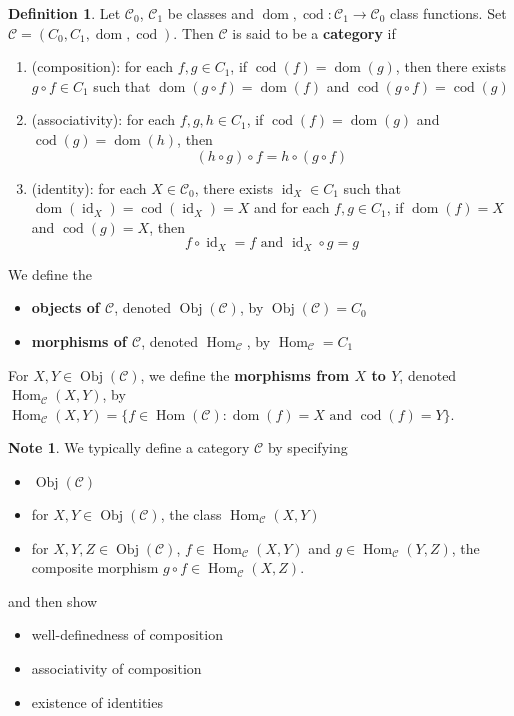 \documentclass{book}
\theoremstyle{definition}
\newtheorem{defn}[definition]{Definition}
\newtheorem{note}[definition]{Note}
\newcommand{\MC}{\mathcal{C}}
\newcommand{\ld}[1]{\label{defn:#1}}
\DeclareMathOperator{\id}{id}
\DeclareMathOperator{\dom}{dom}
\DeclareMathOperator{\cod}{cod}
\DeclareMathOperator{\Obj}{Obj}
\DeclareMathOperator{\Hom}{Hom}
\DeclareMathOperator*{\0}{\mbf{0}}
\DeclareMathOperator*{\1}{\mbf{1}}
\begin{document}
	\begin{defn}  \ld{12001}
		Let $\MC_0$, $\MC_1$ be classes and $\dom, \cod : \MC_1 \rightarrow \MC_0$ class functions. Set $\MC = (C_0, C_1, \dom, \cod)$. Then $\MC$ is said to be a \textbf{category} if 
		\begin{enumerate}
			\item (composition): for each $f,g \in C_1$, if $\cod(f) = \dom(g)$, then there exists $g \circ f \in C_1$ such that $\dom(g \circ f) = \dom(f)$ and $\cod(g \circ f) = \cod(g)$
			\item (associativity): for each $f,g,h \in C_1$, if $\cod(f) = \dom(g)$ and $\cod(g) = \dom(h)$, then $$(h \circ g) \circ f = h \circ (g \circ f)$$  
			\item (identity): for each $X \in \MC_0$, there exists $\id_{X} \in C_1$ such that $\dom(\id_X) = \cod(\id_X) = X$ and for each $f, g \in C_1$, if $\dom(f) = X$ and $\cod(g) = X$, then $$f \circ \id_X = f \text{ and } \id_X \circ g = g$$ 
		\end{enumerate}
		We define the
		\begin{itemize}
			\item \textbf{objects of $\MC$}, denoted $\Obj(\MC)$, by $\Obj(\MC) = C_0$
			\item \textbf{morphisms of $\MC$}, denoted $\Hom_{\MC}$, by $\Hom_{\MC} = C_1$
		\end{itemize}
		For $X, Y \in \Obj(\MC)$, we define the \textbf{morphisms from $X$ to $Y$}, denoted $\Hom_{\MC}(X, Y)$, by $\Hom_{\MC}(X, Y) = \{f \in \Hom(\MC): \dom(f) = X \text{ and } \cod(f) = Y\}$.
	\end{defn}

	\begin{note} 
		We typically define a category $\MC$ by specifying 
		\begin{itemize}
			\item $\Obj(\MC)$
			\item for $X,Y \in \Obj(\MC)$, the class $\Hom_{\MC}(X, Y)$
			\item for $X,Y,Z \in \Obj(\MC)$, $f \in \Hom_{\MC}(X, Y)$ and $g \in \Hom_{\MC}(Y, Z)$, the composite morphism $g \circ f \in \Hom_{\MC}(X,Z)$.
		\end{itemize}
		and then show 
		\begin{itemize}
			\item well-definedness of composition
			\item associativity of composition 
			\item existence of identities 
		\end{itemize}
	\end{note}
\end{document}
